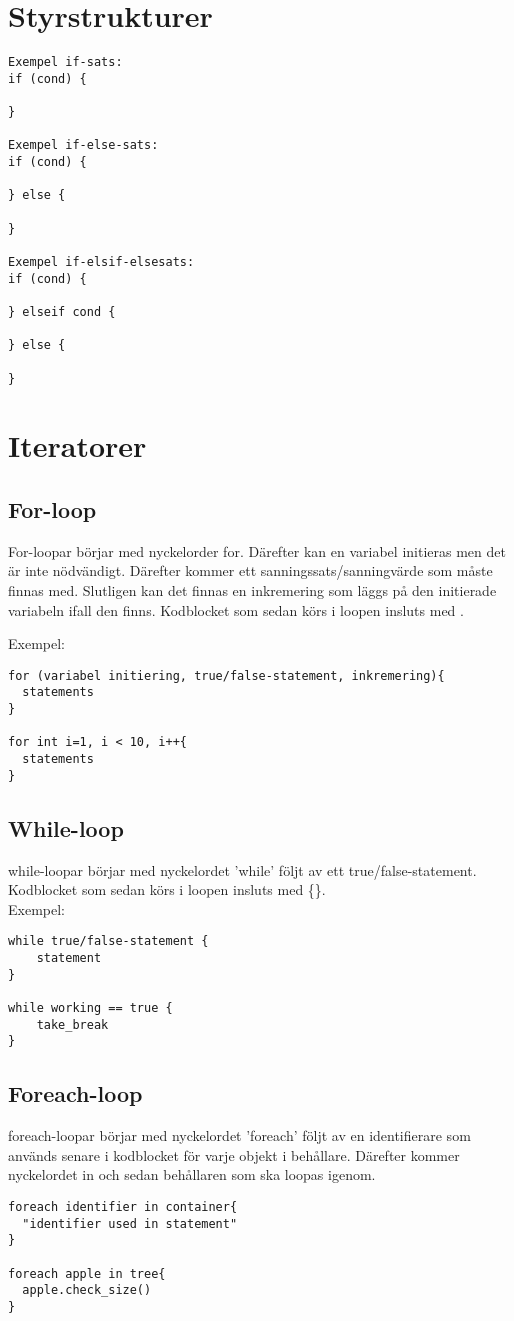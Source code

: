 \documentclass{TDP003mall}
\begin{document}
    \section{Styrstrukturer}
\begin{verbatim}
Exempel if-sats:
if (cond) {
  
}

Exempel if-else-sats:
if (cond) {
  
} else {

}

Exempel if-elsif-elsesats:
if (cond) {
  
} elseif cond {

} else {

}
\end{verbatim}

\section{Iteratorer}

\subsection{For-loop}
For-loopar börjar med nyckelorder for. Därefter kan en variabel initieras men det är inte nödvändigt. Därefter kommer ett sanningssats/sanningvärde som måste finnas med. Slutligen kan det finnas en inkremering som läggs på den initierade variabeln ifall den finns. Kodblocket som sedan körs i loopen insluts med {}.

Exempel:
\begin{verbatim}
for (variabel initiering, true/false-statement, inkremering){
  statements
}

for int i=1, i < 10, i++{
  statements
}
\end{verbatim}
\subsection{While-loop}
while-loopar börjar med nyckelordet 'while' följt av ett true/false-statement. Kodblocket som sedan körs i loopen insluts med \{\}.\\
Exempel:
\begin{verbatim}
while true/false-statement {
    statement
}

while working == true {
    take_break
}
\end{verbatim}
\subsection{Foreach-loop}
foreach-loopar börjar med nyckelordet 'foreach' följt av en identifierare som används senare i kodblocket för varje objekt i behållare.
Därefter kommer nyckelordet in och sedan behållaren som ska loopas igenom. 
\begin{verbatim}
foreach identifier in container{
  "identifier used in statement"
}

foreach apple in tree{
  apple.check_size()
}
\end{verbatim}
\end{document}
